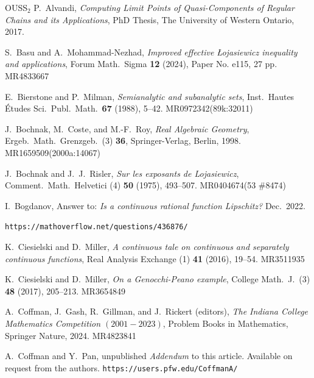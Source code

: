 \documentclass[12pt]{amsart}
\theoremstyle{definition}
\theoremstyle{remark}
\numberwithin{equation}{section}
\begin{document}
\begin{thebibliography}{OUSS$_2$}
 {\sc P.\ Alvandi}, {\sl Computing Limit Points of Quasi-Components of Regular Chains and its Applications}, PhD Thesis, The University of Western Ontario, 2017.

 {\sc S.\ Basu} and {\sc A.\ Mohammad-Nezhad}, {\sl Improved effective \L ojasiewicz inequality and applications}, Forum Math.\ Sigma {\bf12} (2024), Paper No. e115, 27 pp.  MR4833667

 {\sc E.\ Bierstone} and {\sc P.\ Milman}, {\sl
Semianalytic and subanalytic sets},
Inst.\ Hautes \'Etudes Sci.\ Publ.\ Math.\ {\bf67} (1988), 5--42.  MR0972342(89k:32011)


 {\sc J.\ Bochnak}, {\sc M.\ Coste}, and {\sc M.-F.\ Roy}, {\sl Real Algebraic Geometry}, Ergeb.\ Math.\ Grenzgeb.\ (3) {\bf36}, Springer-Verlag, Berlin, 1998.  MR1659509(2000a:14067)

 {\sc J.\ Bochnak} and {\sc J.\ J.\ Risler}, {\sl Sur les exposants de Lojasiewicz}, Comment.\ Math.\ Helvetici (4) {\bf50} (1975), 493--507.  MR0404674(53 \#8474)

 {\sc I.\ Bogdanov}, Answer to: {\sl Is a continuous rational function Lipschitz?} Dec.\ 2022.

{\tt https://mathoverflow.net/questions/436876/} 


 {\sc K.\ Ciesielski} and {\sc D.\ Miller}, {\sl A continuous tale on continuous and separately continuous functions},
Real Analysis Exchange (1) {\bf41} (2016), 19--54. MR3511935

 {\sc K.\ Ciesielski} and {\sc D.\ Miller}, 
{\sl On a Genocchi-Peano example}, College Math.\ J.\ (3) {\bf48} (2017), 205--213. MR3654849

  {\sc A.\ Coffman}, {\sc J.\ Gash}, {\sc R.\ Gillman}, and {\sc
   J.\ Rickert} (editors), {\sl The Indiana College Mathematics
   Competition $(2001-2023)$}, Problem Books
   in Mathematics, Springer Nature, 2024.  MR4823841

 {\sc A.\ Coffman} and {\sc Y.\ Pan}, unpublished {\sl Addendum} to this article.  Available on request from the authors. {\tt https://users.pfw.edu/CoffmanA/}
   

\end{thebibliography}
\end{document}
